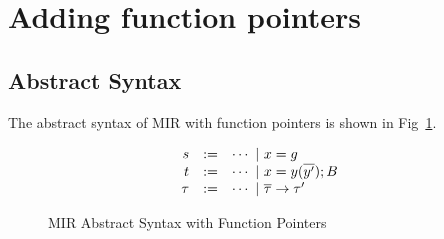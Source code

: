 \documentclass[peerreview, 10pt]{IEEEtran}
\begin{document}
\section{Adding function pointers}

\subsection{Abstract Syntax}
The abstract syntax of MIR with function pointers is shown in Fig~\ref{fig:mir-funcptrs-absyn}.
\begin{figure}[ht]
\centering
\begin{framed}
\[
  \begin{array}{@{}rcl@{}}
    s &:=& \cdots\ |\ x=g \\
    t &:=& \cdots\ |\ x=y(\overline{y'}); B \\
    \tau &:=& \cdots\ |\ \overline{\tau}\rightarrow\tau' \\
  \end{array}
\]
\end{framed}
\caption{MIR Abstract Syntax with Function Pointers}
\label{fig:mir-funcptrs-absyn}
\end{figure}
\end{document}
